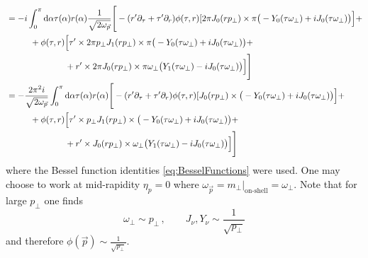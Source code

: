 \begin{subequations}
\begin{align}
                              & =-{i}\int_0^\pi\text{d}\alpha\tau(\alpha) r(\alpha)\frac{1}{\sqrt{2\omega_{\vec{p}}}}\Bigg[-(r^\prime\partial_\tau+\tau^\prime\partial_r)\phi(\tau,r)[2\pi J_0(r p_\perp)\times\pi\big(-Y_0(\tau\omega_\perp)+{i} J_0(\tau\omega_\perp)\big)\Big]+\nonumber                                               \\
                              & \phantom{=}\qquad + \phi(\tau,r)\Big[\tau^\prime\times2\pi p_\perp J_1(r p_\perp)\times\pi\big(-Y_0(\tau\omega_\perp)+{i} J_0(\tau\omega_\perp)\big)+\nonumber                                                                                                                                          \\
                              & \phantom{=}\qquad\phantom{-\phi(\tau,r)\Big[}+r^\prime\times2\pi J_0(r p_\perp)\times\pi\omega_\perp\big(Y_1(\tau\omega_\perp)-{i} J_0(\tau\omega_\perp)\big)\Big]\Bigg]                                                                                                                                \\
                              & =-\frac{2\pi^2{i}}{\sqrt{2\omega_{\vec{p}}}}\int_0^\pi\text{d}\alpha\tau(\alpha) r(\alpha)\Bigg[-(r^\prime\partial_\tau+\tau^\prime\partial_r)\phi(\tau,r)[J_0(r p_\perp)\times\big(-Y_0(\tau\omega_\perp)+{i} J_0(\tau\omega_\perp)\big)\Big]+\nonumber                                                  \\
                              & \phantom{=}\qquad + \phi(\tau,r)\Big[\tau^\prime\times p_\perp J_1(r p_\perp)\times\big(-Y_0(\tau\omega_\perp)+{i} J_0(\tau\omega_\perp)\big)+\nonumber                                                                                                                                                 \\
                              & \phantom{=}\qquad\phantom{-\phi(\tau,r)\Big[}+r^\prime\times J_0(r p_\perp)\times\omega_\perp\big(Y_1(\tau\omega_\perp)-{i} J_0(\tau\omega_\perp)\big)\Big]\Bigg]
    \end{align}
\end{subequations}
where the Bessel function identities \eqref{eq:BesselFunctions} were used. One may choose to work at mid-rapidity $\eta_p=0$ where $\omega_{\vec{p}}=m_\perp\vert_{\text{on-shell}}=\omega_\perp$. Note that for large $p_\perp$ one finds
\begin{equation}
    \omega_\perp\sim p_\perp\,,\qquad J_\nu,Y_\nu\sim\frac{1}{\sqrt{p_\perp}}
\end{equation}
and therefore $\phi(\vec{p})\sim\frac{1}{\sqrt{p_\perp}}$.

